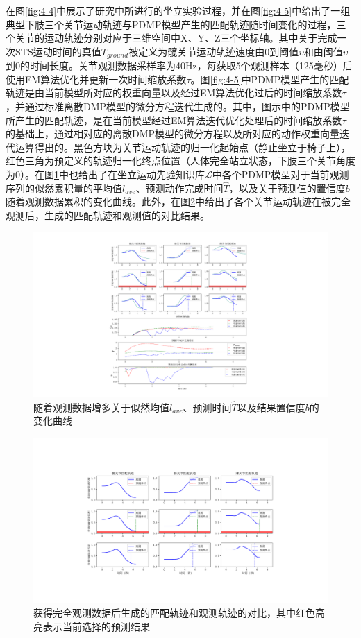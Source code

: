 在图\ref{fig:4-4}中展示了研究中所进行的坐立实验过程，并在图\ref{fig:4-5}中给出了一组典型下肢三个关节运动轨迹与PDMP模型产生的匹配轨迹随时间变化的过程，三个关节的运动轨迹分别对应于三维空间中X、Y、Z三个坐标轴。其中关于完成一次STS运动时间的真值$T_{ground}$被定义为髋关节运动轨迹速度由0到阈值$\upsilon $和由阈值$\upsilon$到0的时间长度。关节观测数据采样率为40Hz，每获取5个观测样本（125毫秒）后使用EM算法优化并更新一次时间缩放系数$\tau$。图\ref{fig:4-5}中PDMP模型产生的匹配轨迹是由当前模型所对应的权重向量以及经过EM算法优化过后的时间缩放系数$\tau$，并通过标准离散DMP模型的微分方程迭代生成的。其中，图示中的PDMP模型所产生的匹配轨迹，是在当前模型经过EM算法迭代优化处理后的时间缩放系数$\tau$的基础上，通过相对应的离散DMP模型的微分方程以及所对应的动作权重向量迭代运算得出的。黑色方块为关节运动轨迹的归一化起始点（静止坐立于椅子上），红色三角为预定义的轨迹归一化终点位置（人体完全站立状态，下肢三个关节角度为0）。在图\ref{fig:4-6}中也给出了在坐立运动先验知识库$\mathscr{L}$中各个PDMP模型对于当前观测序列的似然累积量的平均值$l_{ave}$、预测动作完成时间$\hat T$，以及关于预测值的置信度$b$随着观测数据累积的变化曲线。此外，在图\ref{fig:4-7}中给出了各个关节运动轨迹在被完全观测后，生成的匹配轨迹和观测值的对比结果。
\begin{figure}[htb]
    \centering\includegraphics[width=1\textwidth]{figures/4-Fig-6.pdf}
    \caption{随着观测数据增多关于似然均值$l_{ave}$、预测时间$\hat T$以及结果置信度$b$的变化曲线}
    \label{fig:4-6}
\end{figure}

\begin{figure}[htb]
    \centering\includegraphics[width=1\textwidth]{figures/4-Fig-7.pdf}
    \caption{获得完全观测数据后生成的匹配轨迹和观测轨迹的对比，其中红色高亮表示当前选择的预测结果}
    \label{fig:4-7}
\end{figure}

